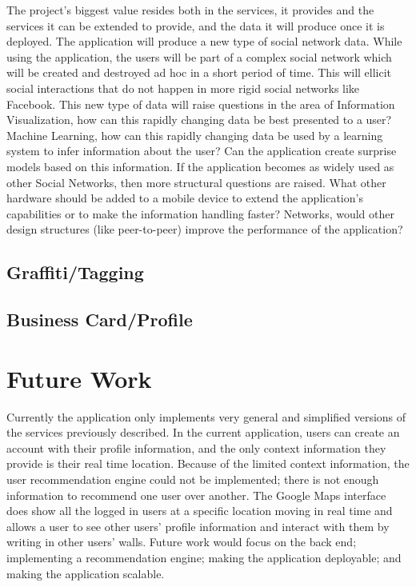 \documentclass[11pt]{article}
\begin{document}
The project's biggest value resides both in the services, it provides and the services it can be extended to provide, and the data it will produce once it is deployed. The application will produce a new type of social network data. While using the application, the users will be part of a complex social network which will be created and destroyed ad hoc in a short period of time. This will ellicit social interactions that do not happen in more rigid social networks like Facebook. This new type of data will raise questions in the area of Information Visualization, how can this rapidly changing data be best presented to a user? Machine Learning, how can this rapidly changing data be used by a learning system to infer information about the user? Can the application create surprise models based on this information. If the application becomes as widely used as other Social Networks, then more structural questions are raised. What other hardware should be added to a mobile device to extend the application's capabilities or to make the information handling faster? Networks, would other design structures (like peer-to-peer) improve the performance of the application?


\subsection{Graffiti/Tagging}

\subsection{Business Card/Profile}


\section{Future Work}

Currently the application only implements very general and simplified versions of the services previously described. In the current application, users can create an account with their profile information, and the only context information they provide is their real time location. Because of the limited context information, the user recommendation engine could not be implemented; there is not enough information to recommend one user over another. The Google Maps interface does show all the logged in users at a specific location moving in real time and allows a user to see other users' profile information and interact with them by writing in other users' walls. Future work would focus on the back end; implementing a recommendation engine;  making the application deployable; and making the application scalable.
\end{document}
